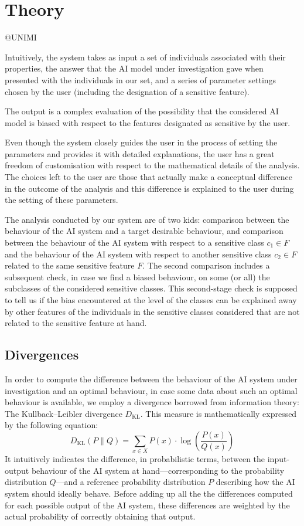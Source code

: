 \documentclass[
]{ceurart}
\begin{document}
\section{Theory}

@UNIMI

Intuitively, the system takes as input a set of individuals associated with their properties, the answer that the AI model under investigation gave when presented with the individuals in our set, and a series of parameter settings chosen by the user (including the designation of a sensitive feature).

The output is a complex evaluation of the possibility that the considered AI model is biased with respect to the features designated as sensitive by the user. 

Even though the system closely guides the user in the process of setting the parameters and provides it with detailed explanations, the user has a great freedom of customisation with respect to the mathematical details of the analysis. The choices left to the user are those that actually make a conceptual difference in the outcome of the analysis and this difference is explained to the user during the setting of these parameters.

The analysis conducted by our system are of two kids: comparison between the behaviour of the AI system and a target desirable behaviour, and comparison between the behaviour of the AI system with respect to a sensitive class $c_1\in F$ and the behaviour of the AI system with respect to another sensitive class $c_2\in F$ related to the same sensitive feature $F$. The second comparison includes a subsequent check, in case we find a biased behaviour, on some (or all) the subclasses of the considered sensitive classes. This second-stage check is supposed to tell us if the bias encountered at the level of the classes can be explained away by other features of the individuals in the sensitive classes considered that are not related to the sensitive feature at hand. 
 
\subsection{Divergences}
In order to compute the difference between the behaviour of the AI system under investigation and an optimal behaviour, in case some data about such an optimal behaviour is available, we employ a divergence borrowed from information theory: The Kullback–Leibler divergence $D_{\mathrm{KL}}$. This measure is mathematically expressed by the following equation: 
\[D_{\mathrm{KL}}(P\parallel Q)= \sum _{x\in X} P(x)\cdot \log ( \frac{P(x)}{Q(x)})\]
It intuitively indicates the difference, in probabilistic terms, between the input-output behaviour of the AI system at hand---corresponding to the probability distribution $Q$---and a reference probability distribution $P$ describing how the AI system should ideally behave. Before adding up all the the differences computed for each possible output of the AI system, these differences are weighted by the actual probability of correctly obtaining that output.
\end{document}

